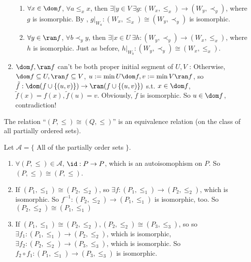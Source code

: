\documentclass{ctexart}
\begin{document}
\begin{solution}
\begin{enumerate}
\begin{enumerate}
            \item $\forall x\in \dom f$, $\forall a\le_{x} x$, then $\exists | y\in V\ \exists g:(W_x,\le_{x})\to(W_y,\prec_{y})$, where $g$ is isomorphic. By , $g|_{W_a}:(W_x,\le_{x})\cong(W_y,\prec_{y})$ is isomorphic.
            \item $\forall y\in \ran f$, $\forall b\prec_{y} y$, then $\exists | x\in U\ \exists h:(W_y,\prec_{y})\to(W_x,\le_{x})$, where $h$ is isomorphic. Just as before, $h|_{W_b}:(W_y,\prec_{y})\cong(W_x,\le_{x})$.
        \end{enumerate} 
    \item $\dom f,\ran f$ can't be both proper initial segment of $U,V$ : Otherwise, $\dom f\subseteq U,\ran f\subseteq V$, $u:=\min U\dom f, v:=\min V\ran f$, so $\tilde{f}:\dom (f\cup\{(u,v)\})\to\ran (f\cup\{(u,v)\})$ s.t. $x\in\dom f$, $\tilde{f}(x)=f(x),\tilde{f}(u)=v$. Obviously, $\tilde{f}$ is isomorphic. So $u\in\dom f$, contradiction!
\end{enumerate}
\end{solution}

\begin{problem}\label{pro:2}
The relation ``$(P,\le)\cong(Q,\le)$'' is an equivalence relation (on the class of all partially ordered sets).
\end{problem}
\begin{solution}
    Let $\mathcal{A}=\{$ All of the partially order sets $\}$.
\begin{enumerate}
    \item $\forall (P,\le)\in \mathcal{A}$, $\id :P\to P$, which is an autoisomophism on $P$. So $(P,\le)\cong (P,\le)$.
    \item If $(P_1,\le_1)\cong (P_2,\le_2)$, so $\exists f: (P_1,\le_1)\to (P_2,\le_2)$, which is isomorphic. So $f^{-1}: (P_2,\le_2)\to (P_1,\le_1)$ is isomorphic, too. So $(P_2,\le_2)\cong (P_1,\le_1)$
    \item If $(P_1,\le_1)\cong (P_2,\le_2), (P_2,\le_2)\cong (P_3,\le_3)$, so so $\exists f_1: (P_1,\le_1)\to (P_2,\le_2)$, which is isomorphic, $\exists f_2: (P_2,\le_2)\to (P_3,\le_3)$, which is isomorphic. So $f_2\circ f_1: (P_1,\le_1)\to(P_3,\le_3)$ is isomorphic.
\end{enumerate}
\end{solution}
\end{document}
